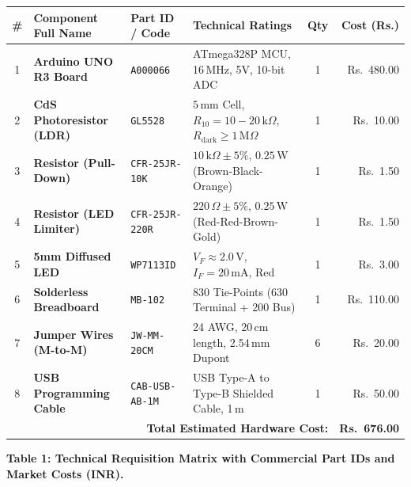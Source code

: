 \documentclass[12pt,a4paper]{article}
\begin{document}
\begin{center}
\footnotesize
\renewcommand{\arraystretch}{1.06}
\begin{tabularx}{\textwidth}{|c|>{\raggedright\arraybackslash}p{3.7cm}|>{\raggedright\arraybackslash}p{2.6cm}|X|c|r|}
\hline
\textbf{\#} & \textbf{Component Full Name} & \textbf{Part ID / Code} & \textbf{Technical Ratings} & \textbf{Qty} & \textbf{Cost (Rs.)} \\
\hline
1 & \textbf{Arduino UNO R3 Board} & \texttt{A000066} & ATmega328P MCU, 16\,MHz, 5V, 10-bit ADC & 1 & Rs.~480.00 \\
\hline
2 & \textbf{CdS Photoresistor (LDR)} & \texttt{GL5528} & $5\,\text{mm}$ Cell, $R_{10} = 10-20\,\text{k}\Omega$, $R_{\text{dark}} \ge 1\,\text{M}\Omega$ & 1 & Rs.~10.00 \\
\hline
3 & \textbf{Resistor (Pull-Down)} & \texttt{CFR-25JR-10K} & $10\,\text{k}\Omega \pm 5\%$, $0.25\,\text{W}$ (Brown-Black-Orange) & 1 & Rs.~1.50 \\
\hline
4 & \textbf{Resistor (LED Limiter)} & \texttt{CFR-25JR-220R} & $220\,\Omega \pm 5\%$, $0.25\,\text{W}$ (Red-Red-Brown-Gold) & 1 & Rs.~1.50 \\
\hline
5 & \textbf{5mm Diffused LED} & \texttt{WP7113ID} & $V_F \approx 2.0\,\text{V}$, $I_F = 20\,\text{mA}$, Red & 1 & Rs.~3.00 \\
\hline
6 & \textbf{Solderless Breadboard} & \texttt{MB-102} & 830 Tie-Points (630 Terminal + 200 Bus) & 1 & Rs.~110.00 \\
\hline
7 & \textbf{Jumper Wires (M-to-M)} & \texttt{JW-MM-20CM} & 24 AWG, 20\,cm length, 2.54\,mm Dupont & 6 & Rs.~20.00 \\
\hline
8 & \textbf{USB Programming Cable} & \texttt{CAB-USB-AB-1M} & USB Type-A to Type-B Shielded Cable, 1\,m & 1 & Rs.~50.00 \\
\hline
\multicolumn{5}{|r|}{\textbf{Total Estimated Hardware Cost:}} & \textbf{Rs.~676.00} \\
\hline
\end{tabularx}
\vspace{0.10cm}
{\footnotesize\textbf{Table 1: Technical Requisition Matrix with Commercial Part IDs and Market Costs (INR).}}
\end{center}
\end{document}
